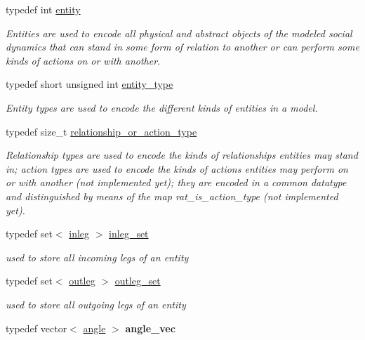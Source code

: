 \begin{DoxyCompactItemize}
typedef int \hyperlink{namespacetricl_a57273122278e8b301844e2a2e1f0742f}{entity}
\begin{DoxyCompactList}\small\item\em Entities are used to encode all physical and abstract objects of the modeled social dynamics that can stand in some form of relation to another or can perform some kinds of actions on or with another. \end{DoxyCompactList}\item 
typedef short unsigned int \hyperlink{namespacetricl_afd4de3aedd5e48cf955f03457386e98f}{entity\+\_\+type}
\begin{DoxyCompactList}\small\item\em Entity types are used to encode the different kinds of entities in a model. \end{DoxyCompactList}\item 
typedef size\+\_\+t \hyperlink{namespacetricl_a2d01894944fb58a8fedc0912a48d13f8}{relationship\+\_\+or\+\_\+action\+\_\+type}
\begin{DoxyCompactList}\small\item\em Relationship types are used to encode the kinds of relationships entities may stand in; action types are used to encode the kinds of actions entities may perform on or with another (not implemented yet); they are encoded in a common datatype and distinguished by means of the map rat\+\_\+is\+\_\+action\+\_\+type (not implemented yet). \end{DoxyCompactList}\item 
\mbox{\label{namespacetricl_a703ed53fa2dba74d8f51ede5fd46038d}} 
typedef set$<$ \hyperlink{structtricl_1_1inleg}{inleg} $>$ \hyperlink{namespacetricl_a703ed53fa2dba74d8f51ede5fd46038d}{inleg\+\_\+set}
\begin{DoxyCompactList}\small\item\em used to store all incoming legs of an entity \end{DoxyCompactList}\item 
\mbox{\label{namespacetricl_ac36fc4606da3d7f9ffd1764942fe5940}} 
typedef set$<$ \hyperlink{structtricl_1_1outleg}{outleg} $>$ \hyperlink{namespacetricl_ac36fc4606da3d7f9ffd1764942fe5940}{outleg\+\_\+set}
\begin{DoxyCompactList}\small\item\em used to store all outgoing legs of an entity \end{DoxyCompactList}\item 
\mbox{\label{namespacetricl_a3de3d7b28165426ea812bd7d6096540a}} 
typedef vector$<$ \hyperlink{structtricl_1_1angle}{angle} $>$ {\bfseries angle\+\_\+vec}
\end{DoxyCompactItemize}
